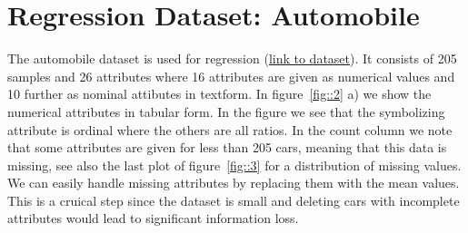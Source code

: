 \documentclass[11pt]{article}
\begin{document}
\section{Regression Dataset: Automobile}
The automobile dataset is used for regression (\href{https://archive.ics.uci.edu/ml/datasets/automobile}{link to dataset}). It consists of 205 samples and 26 attributes where 16 attributes are given as numerical values and 10 further as nominal attibutes in textform. In figure~\ref{fig::2} a) we show the numerical attributes in tabular form. In the figure we see that the symbolizing attribute is ordinal where the others are all ratios. In the count column we note that some attributes are given for less than 205 cars, meaning that this data is missing, see also the last plot of figure~\ref{fig::3} for a distribution of missing values. We can easily handle missing attributes by replacing them with the mean values. This is a cruical step since the dataset is small and deleting cars with incomplete attributes would lead to significant information loss.  
%
\end{document}
